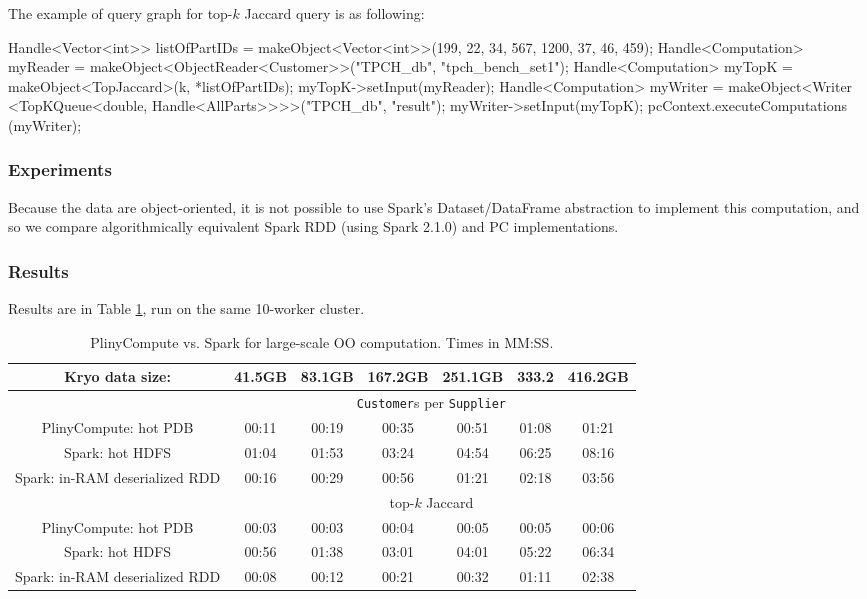 \vspace{5pt}
The example of query graph for top-$k$ Jaccard query is as following:

\begin{code}
    Handle<Vector<int>> listOfPartIDs = 
          makeObject<Vector<int>>(199, 22, 34, 567, 1200, 37, 46, 459);
    Handle<Computation> myReader = 
         makeObject<ObjectReader<Customer>>("TPCH_db", "tpch_bench_set1");
    Handle<Computation> myTopK = makeObject<TopJaccard>(k, *listOfPartIDs);
    myTopK->setInput(myReader);
    Handle<Computation> myWriter = makeObject<Writer
          <TopKQueue<double, Handle<AllParts>>>>("TPCH_db", "result");
    myWriter->setInput(myTopK);
    pcContext.executeComputations (myWriter);
\end{code}

\subsubsection{Experiments}
Because the data are object-oriented, it
is not possible to use Spark's Dataset/DataFrame abstraction to implement this computation, and so
we compare algorithmically equivalent Spark RDD (using Spark 2.1.0)
and PC implementations.

\subsubsection{Results}
Results are in Table \ref{fig:TPC}, run on the same 10-worker cluster.  

\begin{table}[h!]
\begin{center}
\begin{tabular}{|c||c|c|c|c|c|c|}
\hline
Kryo data size: &41.5GB & 83.1GB & 167.2GB &251.1GB &333.2 &416.2GB \\
\hline
& \multicolumn{6}{c|}{\texttt{Customer}s per \texttt{Supplier}} \\
\hline
PlinyCompute: hot PDB & 00:11&	00:19&	00:35&	00:51&	01:08&	01:21 \\
Spark: hot HDFS & 01:04&	01:53&	03:24&	04:54&	06:25&	08:16\\
Spark: in-RAM deserialized RDD & 00:16& 	00:29& 	00:56& 	01:21& 	02:18& 	03:56\\
\hline
& \multicolumn{6}{c|}{top-$k$ Jaccard} \\
\hline
PlinyCompute: hot PDB & 00:03&	00:03&	00:04&	00:05&	00:05&	00:06 \\
Spark: hot HDFS & 00:56&	01:38&	03:01 & 04:01&	05:22&	06:34\\
Spark: in-RAM deserialized RDD & 00:08& 	00:12& 	00:21 & 00:32& 	01:11& 	02:38\\
\hline
\end{tabular}
\caption{PlinyCompute vs. Spark for large-scale OO computation. Times in MM:SS.}
\label{fig:TPC}
\end{center}
\end{table}

